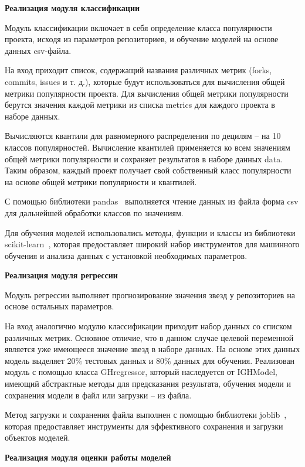 \textbf{Реализация модуля классификации}

Модуль классификации включает в себя определение класса популярности проекта, исходя из параметров репозиториев, и обучение моделей на основе данных csv-файла.

На вход приходит список, содержащий названия различных метрик (forks, commits, issues и т. д.), которые будут использоваться для вычисления общей метрики популярности проекта. Для вычисления общей метрики популярности берутся значения каждой метрики из списка metrics для каждого проекта в наборе данных. 

Вычисляются квантили для равномерного распределения по децилям -- на 10 классов популярностей. Вычисление квантилей применяется ко всем значениям общей метрики популярности и сохраняет результатов в наборе данных data. Таким образом, каждый проект получает свой собственный класс популярности на основе общей метрики популярности и квантилей.

С помощью библиотеки pandas~\cite{pandas} выполняется чтение данных из файла форма csv для дальнейшей обработки классов по значениям. 

Для обучения моделей использовались методы, функции и классы из библиотеки scikit-learn~\cite{sklearn}, которая  предоставляет широкий набор инструментов для машинного обучения и анализа данных с установкой необходимых параметров.
\vspace{1em}

\textbf{Реализация модуля регрессии}

Модуль регрессии выполняет прогнозирование значения звезд у репозиториев на основе остальных параметров.

На вход аналогично модулю классификации приходит набор данных со списком различных метрик. Основное отличие, что в данном случае целевой переменной является уже имеющееся значение звезд в наборе данных. На основе этих данных модель выделяет 20\% тестовых данных и 80\% данных для обучения. Реализован модуль с помощью класса GHregressor, который наследуется от IGHModel, имеющий абстрактные методы для предсказания результата, обучения модели и сохранения модели в файл или загрузки -- из файла. 

Метод загрузки и сохранения файла выполнен с помощью библиотеки joblib~\cite{joblib}, которая предоставляет инструменты для эффективного сохранения и загрузки объектов моделей.
\vspace{1em}

\textbf{Реализация модуля оценки работы моделей}

